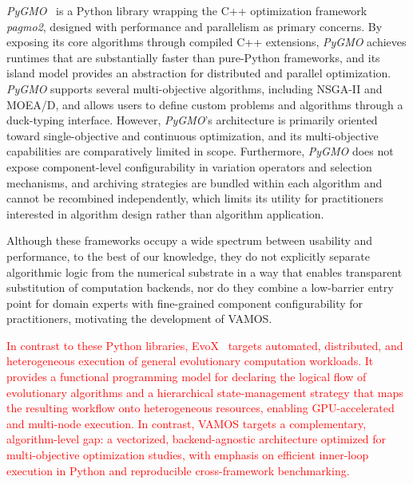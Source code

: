 \documentclass[journal]{IEEEtran}
\newcommand{\VAMOS}{VAMOS}
\begin{document}
\textit{PyGMO}~\cite{BI20} is a Python library wrapping the C++ optimization framework \textit{pagmo2}, designed with performance and parallelism as primary concerns. By exposing its core algorithms through compiled C++ extensions, \textit{PyGMO} achieves runtimes that are substantially faster than pure-Python frameworks, and its island model provides an abstraction for distributed and parallel optimization. \textit{PyGMO} supports several multi-objective algorithms, including NSGA-II and MOEA/D, and allows users to define custom problems and algorithms through a duck-typing interface. However, \textit{PyGMO}'s architecture is primarily oriented toward single-objective and continuous optimization, and its multi-objective capabilities are comparatively limited in scope. Furthermore, \textit{PyGMO} does not expose component-level configurability in variation operators and selection mechanisms, and archiving strategies are bundled within each algorithm and cannot be recombined independently, which limits its utility for practitioners interested in algorithm design rather than algorithm application.

Although these frameworks occupy a wide spectrum between usability and performance, to the best of our knowledge, they do not explicitly separate algorithmic logic from the numerical substrate in a way that enables transparent substitution of computation backends, nor do they combine a low-barrier entry point for domain experts with fine-grained component configurability for practitioners, motivating the development of VAMOS. 

\textcolor{red}{In contrast to these Python libraries, EvoX~\cite{HCL+25} targets automated, distributed, and heterogeneous execution of general evolutionary computation workloads. It provides a functional programming model for declaring the logical flow of evolutionary algorithms and a hierarchical state-management strategy that maps the resulting workflow onto heterogeneous resources, enabling GPU-accelerated and multi-node execution. In contrast, \VAMOS{} targets a complementary, algorithm-level gap: a vectorized, backend-agnostic architecture optimized for multi-objective optimization studies, with emphasis on efficient inner-loop execution in Python and reproducible cross-framework benchmarking.}
\end{document}
